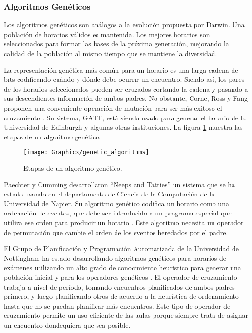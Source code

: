 \subsubsection{Algoritmos Genéticos}

Los algoritmos genéticos son análogos a la evolución propuesta por Darwin. Una población de horarios válidos
es mantenida. Los mejores horarios son seleccionados para formar las bases de la próxima generación, mejorando
la calidad de la población al mismo tiempo que se mantiene la diversidad.

La representación genética más común para un horario es una larga cadena de bits codificando cuándo y dónde
debe ocurrir un encuentro. Siendo así, los pares de los horarios seleccionados pueden ser cruzados cortando
la cadena y pasando a sus descendientes información de ambos padres. No obstante, Corne, Ross y Fang proponen
una conveniente operación de mutación para ser más exitoso el cruzamiento \cite{D Corne and P Ross and HL Fang}.
Su sistema, GATT, está siendo usado para generar el horario de la Universidad de Edinburgh y algunas otras
instituciones. La figura \ref{genetic algorithms} muestra las etapas de un algoritmo gen\'etico.

\begin{figure}
	\begin{center}
		\label{genetic algorithms}
		\texttt{[image: Graphics/genetic\_algorithms]}
		\caption{Etapas de un algoritmo genético.}		
	\end{center}	
\end{figure}

Paechter y Cumming desarrollaron ``Neeps and Tatties'' un sistema que se ha estado usando en el departamento
de Ciencia de la Computación de la Universidad de Napier. Su algoritmo genético codifica un horario como una ordenación
de eventos, que debe ser introducido a un programa especial que utiliza ese orden para producir un horario
\cite{B Paechter* and A Cumming* and H Luchian}. Este algoritmo necesita un operador de permutación 
que cambie el orden de los eventos heredados por el padre.

El Grupo de Planificación y Programación Automatizada de la Universidad de Nottingham ha estado desarrollando
algoritmos genéticos para horarios de exámenes utilizando un alto grado de conocimiento heurístico para generar
una población inicial y para los operadores genéticos \cite{EK Burke and DG Elliman and RF Weare 1, 
EK Burke and DG Elliman and RF Weare 2, EK Burke and DG Elliman and RF Weare 3}. El operador de cruzamiento
trabaja a nivel de período, tomando encuentros planificados de ambos padres primero, y luego planificando
otros de acuerdo a la heurística de ordenamiento hasta que no se puedan planificar más encuentros. Este tipo de operador de cruzamiento permite un uso eficiente de las aulas porque siempre trata de asignar un encuentro dondequiera que sea posible.

